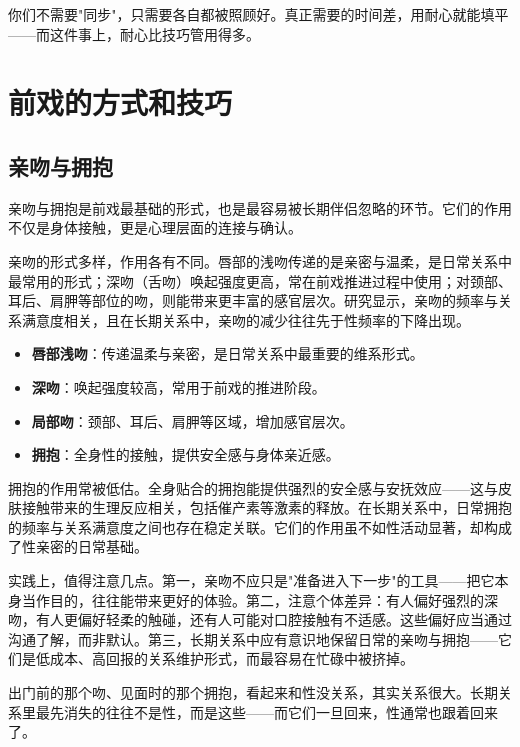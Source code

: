 \documentclass[12pt,UTF8]{ctexbook}
\newcommand{\keyword}[1]{\textbf{#1}}
\begin{document}
\begin{tcolorbox}[colback=pink!5!white,colframe=red!50!black,title=贴心小叮咛]
你们不需要"同步"，只需要各自都被照顾好。真正需要的时间差，用耐心就能填平——而这件事上，耐心比技巧管用得多。
\end{tcolorbox}

\section{前戏的方式和技巧}
\subsection{亲吻与拥抱}

亲吻与拥抱是前戏最基础的形式，也是最容易被长期伴侣忽略的环节。它们的作用不仅是身体接触，更是心理层面的连接与确认。

亲吻的形式多样，作用各有不同。唇部的浅吻传递的是亲密与温柔，是日常关系中最常用的形式；深吻（舌吻）唤起强度更高，常在前戏推进过程中使用；对颈部、耳后、肩胛等部位的吻，则能带来更丰富的感官层次。研究显示，亲吻的频率与关系满意度相关，且在长期关系中，亲吻的减少往往先于性频率的下降出现。

\begin{itemize}
  \item \keyword{唇部浅吻}：传递温柔与亲密，是日常关系中最重要的维系形式。
  \item \keyword{深吻}：唤起强度较高，常用于前戏的推进阶段。
  \item \keyword{局部吻}：颈部、耳后、肩胛等区域，增加感官层次。
  \item \keyword{拥抱}：全身性的接触，提供安全感与身体亲近感。
\end{itemize}

拥抱的作用常被低估。全身贴合的拥抱能提供强烈的安全感与安抚效应——这与皮肤接触带来的生理反应相关，包括催产素等激素的释放。在长期关系中，日常拥抱的频率与关系满意度之间也存在稳定关联。它们的作用虽不如性活动显著，却构成了性亲密的日常基础。

实践上，值得注意几点。第一，亲吻不应只是"准备进入下一步"的工具——把它本身当作目的，往往能带来更好的体验。第二，注意个体差异：有人偏好强烈的深吻，有人更偏好轻柔的触碰，还有人可能对口腔接触有不适感。这些偏好应当通过沟通了解，而非默认。第三，长期关系中应有意识地保留日常的亲吻与拥抱——它们是低成本、高回报的关系维护形式，而最容易在忙碌中被挤掉。

\begin{tcolorbox}[colback=pink!5!white,colframe=red!50!black,title=贴心小叮咛]
出门前的那个吻、见面时的那个拥抱，看起来和性没关系，其实关系很大。长期关系里最先消失的往往不是性，而是这些——而它们一旦回来，性通常也跟着回来了。
\end{tcolorbox}
\end{document}
